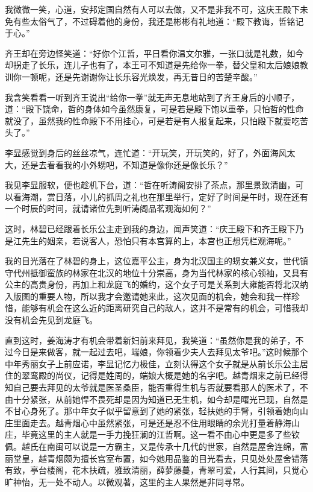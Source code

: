 我微微一笑，心道，安邦定国自然有人可以去做，又不是非我不可，这庆王殿下未免有些太俗气了，不过碍着他的身份，我还是彬彬有礼地道：“殿下教诲，哲铭记于心。”

齐王却在旁边怪笑道：“好你个江哲，平日看你温文尔雅，一张口就是礼数，如今却拐走了长乐，连儿子也有了，本王可不知道是先给你一拳，替父皇和太后娘娘教训你一顿呢，还是先谢谢你让长乐容光焕发，再无昔日的苦楚辛酸。”

我含笑看看一听到齐王说出“给你一拳”就无声无息地站到了齐王身后的小顺子，道：“殿下饶命，哲的身体如今虽然康复，可是若是殿下饱以重拳，只怕哲的性命就没了，虽然我的性命殿下不用挂心，可是若是有人报复起来，只怕殿下就要吃苦头了。”

李显感觉到身后的丝丝凉气，连忙道：“开玩笑，开玩笑的，好了，外面海风太大，还是去看看我的小外甥吧，不知道是像你还是像长乐？”

我见李显服软，便也趁机下台，道：“哲在听涛阁安排了茶点，那里景致清幽，可以看海潮，赏日落，小儿的抓周之礼也在那里举行，定好了时间是午时，现在还有一个时辰的时间，就请诸位先到听涛阁品茗观海如何？”

这时，林碧已经跟着长乐公主走到我的身边，闻声笑道：“庆王殿下和齐王殿下乃是江先生的姻亲，若说客人，恐怕只有本宫算的上，本宫也正想凭栏观海呢。”

我的目光落在了林碧的身上，这位嘉平公主，身为北汉国主的甥女兼义女，世代镇守代州抵御蛮族的林家在北汉的地位十分崇高，身为当代林家的核心领袖，又具有公主的高贵身份，再加上和龙庭飞的婚约，这个女子可是关系到大雍能否将北汉纳入版图的重要人物，所以我才会邀请她来此，这次见面的机会，她会和我一样珍惜，能够有机会在这么近的距离研究自己的敌人，这并不是常有的机会，可惜我却没有机会先见到龙庭飞。

直到这时，姜海涛才有机会带着新妇前来拜见，我笑道：“虽然你是我的弟子，不过今日是来做客，就一起过去吧，端娘，你领着少夫人去拜见太爷吧。”这时候那个中年秀丽女子上前应诺，李显记忆力极佳，立刻认得这个女子就是从前长乐公主居住的翠鸾殿的尚仪，记得是姓周的，端娘大概是她的名字吧。越青烟来之前已经得知自己要去拜见的太爷就是医圣桑臣，能否重得生机与否就要看那人的医术了，不由十分紧张，从前她悍不畏死却是因为知道已无生机，如今却是曙光已现，自然是不甘心身死了。那中年女子似乎留意到了她的紧张，轻扶她的手臂，引领着她向山庄里面走去。越青烟心中虽然紧张，可是还是忍不住用眼睛的余光打量着静海山庄，毕竟这里的主人就是一手力挽狂澜的江哲啊。这一看不由心中更是多了些钦佩。越氏在南闽可以说是一方霸主，又是传承十几代的世家，自然是屋舍连绵，富丽堂皇，越青烟颇为擅长宫室布置，如今她用品鉴的目光看去，只见处处屋舍错落有致，亭台楼阁，花木扶疏，雅致清丽，薛萝藤蔓，青翠可爱，人行其间，只觉心旷神怡，无一处不动人。以微观著，这里的主人果然是非同寻常。

